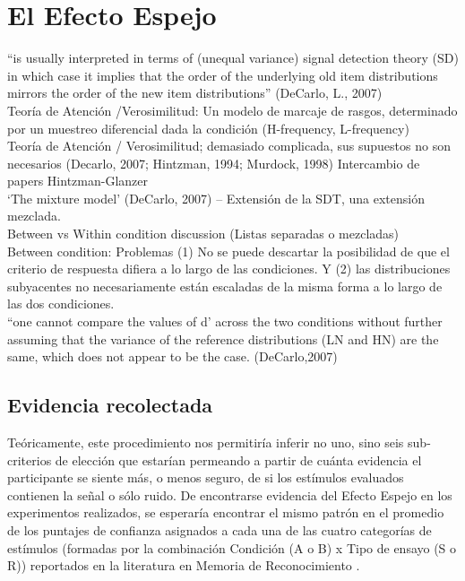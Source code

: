 \section{El Efecto Espejo}

“is usually interpreted in terms of (unequal variance) signal detection theory (SD) in which case it implies that the order of the underlying old item distributions mirrors the order of the new item distributions” (DeCarlo, L.,  2007)\\
Teoría de Atención /Verosimilitud: Un modelo de marcaje de rasgos, determinado por un muestreo diferencial dada la condición (H-frequency, L-frequency)\\
Teoría de Atención / Verosimilitud; demasiado complicada, sus supuestos no son necesarios (Decarlo, 2007; Hintzman, 1994; Murdock, 1998) Intercambio de papers Hintzman-Glanzer\\
‘The mixture model’ (DeCarlo, 2007) – Extensión de la SDT, una extensión mezclada.\\
Between vs Within condition discussion (Listas separadas o mezcladas)\\
Between condition: Problemas (1) No se puede descartar la posibilidad de que el criterio de respuesta difiera a lo largo de las condiciones. Y (2) las distribuciones subyacentes no necesariamente están escaladas de la misma forma a lo largo de las dos condiciones.\\
“one cannot compare the values of d’ across the two conditions without further assuming that the variance of the reference distributions (LN and HN) are the same, which does not appear to be the case. (DeCarlo,2007)  


\subsection{Evidencia recolectada}

Teóricamente, este procedimiento nos permitiría inferir no uno, sino seis sub-criterios de elección que estarían permeando a partir de cuánta evidencia el participante se siente más, o menos seguro, de si los estímulos evaluados contienen la señal o sólo ruido. De encontrarse evidencia del Efecto Espejo en los experimentos realizados, se esperaría encontrar el mismo patrón en el promedio de los puntajes de confianza asignados a cada una de las cuatro categorías de estímulos (formadas por la combinación Condición (A o B) x Tipo de ensayo (S o R)) reportados en la literatura en Memoria de Reconocimiento \parencite{Glanzer1990, Glanzer1993}. \\

